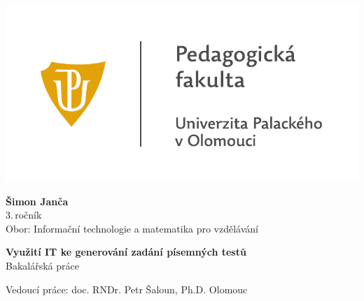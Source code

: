 \documentclass[11pt,a4paper]{report}
\begin{document}
	\begin{titlepage}
		\begin{center}
            {
            \centering
            \includegraphics[]{./files/img/UP_logo_PdF-UP_horizont_cz.pdf}
            }
			
			\vspace{3cm}

            {
                \LARGE
                \textbf{Šimon Janča}\\
                3.\,ročník\\[8mm]
                Obor: Informační technologie a matematika pro vzdělávání
            }

            \vspace{4cm}
			
			{
			    \textbf{\Huge Využití IT ke generování zadání písemných testů}\\[4mm]
			    \Large
			    Bakalářská práce
			}

            \vfill
            
            {
                Vedoucí práce:
                doc. RNDr. Petr Šaloun, Ph.D.
                \hfill
    			Olomouc \the\year{}
            }
			
		\end{center}
	\end{titlepage}
    
    
    \thispagestyle{empty} %
    \null\vfill %
\end{document}

